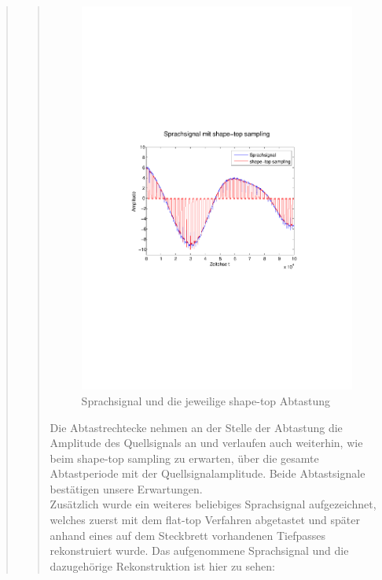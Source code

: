 \begin{quote}
\begin{quote}
            \begin{figure}[H]
            \centering
            \includegraphics[scale=0.6, trim = 3.5cm 9cm 4cm 9cm,
            clip]{./Bilder/sprache_shape-top}
                \caption{Sprachsignal und die jeweilige shape-top Abtastung}
            \end{figure}
            
            Die Abtastrechtecke nehmen an der Stelle der Abtastung die Amplitude des
            Quellsignals an und verlaufen auch weiterhin, wie beim shape-top
            sampling zu erwarten, über die gesamte Abtastperiode mit der
            Quellsignalamplitude. Beide Abtastsignale bestätigen unsere
            Erwartungen.\\
            
            Zusätzlich wurde ein weiteres beliebiges Sprachsignal aufgezeichnet,
            welches zuerst mit dem flat-top Verfahren abgetastet und später anhand
            eines auf dem Steckbrett vorhandenen Tiefpasses rekonstruiert wurde. Das
            aufgenommene Sprachsignal und die dazugehörige Rekonstruktion ist hier
            zu sehen:
            

\end{quote}
\end{quote}
